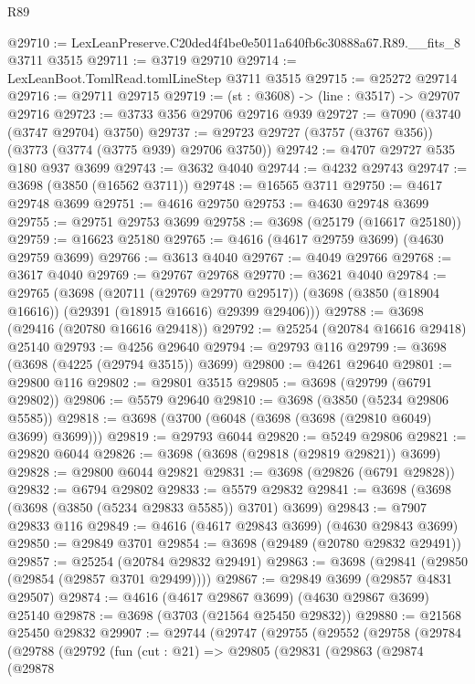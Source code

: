 \begin{lexlean}{R89}
\begin{coremodule}
@29710 := LexLeanPreserve.C20ded4f4be0e5011a640fb6c30888a67.R89.__fits_8 @3711 @3515
@29711 := @3719 @29710
@29714 := LexLeanBoot.TomlRead.tomlLineStep @3711 @3515
@29715 := @25272 @29714
@29716 := @29711 @29715
@29719 := (st : @3608) -> (line : @3517) -> @29707 @29716
@29723 := @3733 @356 @29706 @29716 @939
@29727 := @7090 (@3740 (@3747 @29704) @3750)
@29737 := @29723 @29727 (@3757 (@3767 @356)) (@3773 (@3774 (@3775 @939) @29706 @3750))
@29742 := @4707 @29727 @535 @180 @937 @3699
@29743 := @3632 @4040
@29744 := @4232 @29743
@29747 := @3698 (@3850 (@16562 @3711))
@29748 := @16565 @3711
@29750 := @4617 @29748 @3699
@29751 := @4616 @29750
@29753 := @4630 @29748 @3699
@29755 := @29751 @29753 @3699
@29758 := @3698 (@25179 (@16617 @25180))
@29759 := @16623 @25180
@29765 := @4616 (@4617 @29759 @3699) (@4630 @29759 @3699)
@29766 := @3613 @4040
@29767 := @4049 @29766
@29768 := @3617 @4040
@29769 := @29767 @29768
@29770 := @3621 @4040
@29784 := @29765
    (@3698
      (@20711 (@29769 @29770 @29517))
      (@3698 (@3850 (@18904 @16616)) (@29391 (@18915 @16616) @29399 @29406)))
@29788 := @3698 (@29416 (@20780 @16616 @29418))
@29792 := @25254 (@20784 @16616 @29418) @25140
@29793 := @4256 @29640
@29794 := @29793 @116
@29799 := @3698 (@3698 (@4225 (@29794 @3515)) @3699)
@29800 := @4261 @29640
@29801 := @29800 @116
@29802 := @29801 @3515
@29805 := @3698 (@29799 (@6791 @29802))
@29806 := @5579 @29640
@29810 := @3698 (@3850 (@5234 @29806 @5585))
@29818 := @3698 (@3700 (@6048 (@3698 (@3698 (@29810 @6049) @3699) @3699)))
@29819 := @29793 @6044
@29820 := @5249 @29806
@29821 := @29820 @6044
@29826 := @3698 (@3698 (@29818 (@29819 @29821)) @3699)
@29828 := @29800 @6044 @29821
@29831 := @3698 (@29826 (@6791 @29828))
@29832 := @6794 @29802
@29833 := @5579 @29832
@29841 := @3698 (@3698 (@3698 (@3850 (@5234 @29833 @5585)) @3701) @3699)
@29843 := @7907 @29833 @116
@29849 := @4616 (@4617 @29843 @3699) (@4630 @29843 @3699)
@29850 := @29849 @3701
@29854 := @3698 (@29489 (@20780 @29832 @29491))
@29857 := @25254 (@20784 @29832 @29491)
@29863 := @3698 (@29841 (@29850 (@29854 (@29857 @3701 @29499))))
@29867 := @29849 @3699 (@29857 @4831 @29507)
@29874 := @4616 (@4617 @29867 @3699) (@4630 @29867 @3699) @25140
@29878 := @3698 (@3703 (@21564 @25450 @29832))
@29880 := @21568 @25450 @29832
@29907 := @29744
    (@29747
      (@29755
        (@29552
          (@29758
            (@29784
              (@29788
                (@29792
                  (fun (cut : @21) =>
                  @29805
                    (@29831
                      (@29863
                        (@29874
                          (@29878

\end{coremodule}
\end{lexlean}
